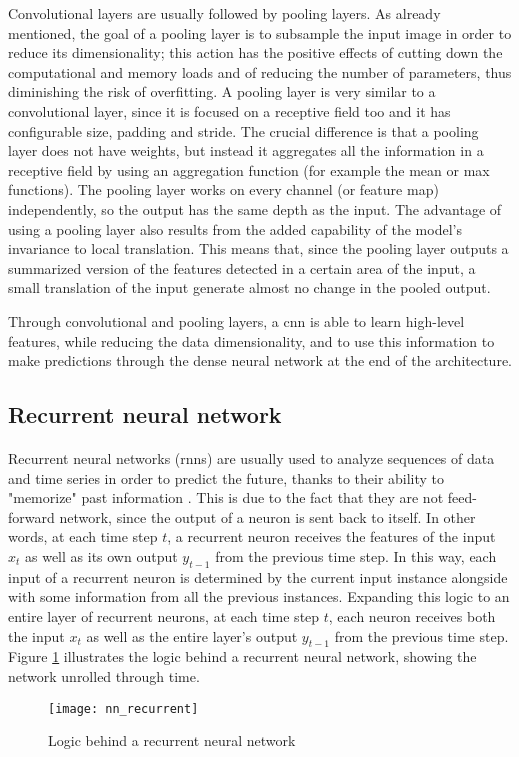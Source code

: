 Convolutional layers are usually followed by pooling layers. As already mentioned, the goal of a pooling layer is to subsample the input image in order to reduce its dimensionality; this action has the positive effects of cutting down the computational and memory loads and of reducing the number of parameters, thus diminishing the risk of overfitting. A pooling layer is very similar to a convolutional layer, since it is focused on a receptive field too and it has configurable size, padding and stride. The crucial difference is that a pooling layer does not have weights, but instead it aggregates all the information in a receptive field by using an aggregation function (for example the mean or max functions). The pooling layer works on every channel (or feature map) independently, so the output has the same depth as the input. The advantage of using a pooling layer also results from the added capability of the model’s invariance to local translation. This means that, since the pooling layer outputs a summarized version of the features detected in a certain area of the input, a small translation of the input generate almost no change in the pooled output.

Through convolutional and pooling layers, a \acs{cnn} is able to learn high-level features, while reducing the data dimensionality, and to use this information to make predictions through the dense neural network at the end of the architecture.


\subsection{Recurrent neural network}
 \paragraph{} Recurrent neural networks (\acsp{rnn}) are usually used to analyze sequences of data and time series in order to predict the future, thanks to their ability to "memorize" past information \cite{OReilly:handsonML}. This is due to the fact that they are not feed-forward network, since the output of a neuron is sent back to itself. In other words, at each time step $t$, a recurrent neuron receives the features of the input $x_t$ as well as its own output $y_{t-1}$ from the previous time step. In this way, each input of a recurrent neuron is determined by the current input instance alongside with some information from all the previous instances. Expanding this logic to an entire layer of recurrent neurons, at each time step $t$, each neuron receives both the input $x_t$ as well as the entire layer's output $y_{t-1}$ from the previous time step. Figure \ref{fig:nn_recurrent} illustrates the logic behind a recurrent neural network, showing the network unrolled through time.
\begin{figure}[t]
    \centering
    \texttt{[image: nn\_recurrent]}
    \caption{Logic behind a recurrent neural network}
    \label{fig:nn_recurrent}
\end{figure}

